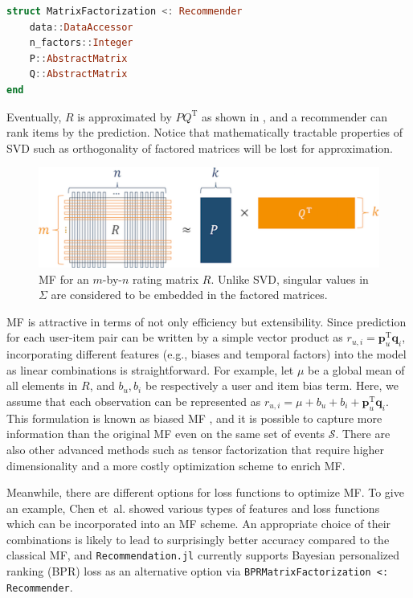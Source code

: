 \begin{lstlisting}[language = Julia]
struct MatrixFactorization <: Recommender
    data::DataAccessor
    n_factors::Integer
    P::AbstractMatrix
    Q::AbstractMatrix
end
\end{lstlisting}

Eventually, $R$ is approximated by $PQ^{\mathrm{T}}$ as shown in , and a recommender can rank items by the prediction. Notice that mathematically tractable properties of SVD such as orthogonality of factored matrices will be lost for approximation.

\begin{figure}[htbp]
  \centering
  \includegraphics[width=0.8\linewidth]{images/mf.pdf}
  \caption{MF for an $m$-by-$n$ rating matrix $R$. Unlike SVD, singular values in $\Sigma$ are considered to be embedded in the factored matrices.}
  \label{fig:mf}
\end{figure}

MF is attractive in terms of not only efficiency but extensibility. Since prediction for each user-item pair can be written by a simple vector product as $r_{u,i} = \mathbf{p}_u^{\mathrm{T}} \mathbf{q}_i$, incorporating different features (e.g., biases and temporal factors) into the model as linear combinations is straightforward. For example, let $\mu$ be a global mean of all elements in $R$, and $b_u, b_i$ be respectively a user and item bias term. Here, we assume that each observation can be represented as $r_{u,i} = \mu + b_u + b_i + \mathbf{p}_u^{\mathrm{T}} \mathbf{q}_i$. This formulation is known as biased MF \cite{Koren2009}, and it is possible to capture more information than the original MF even on the same set of events $\mathcal{S}$. There are also other advanced methods such as tensor factorization \cite{Karatzoglou2010} that require higher dimensionality and a more costly optimization scheme to enrich MF.

Meanwhile, there are different options for loss functions to optimize MF. To give an example, Chen et~al. \cite{Chen2011} showed various types of features and loss functions which can be incorporated into an MF scheme. An appropriate choice of their combinations is likely to lead to surprisingly better accuracy compared to the classical MF, and \texttt{Recommendation.jl} currently supports Bayesian personalized ranking (BPR) loss \cite{10.5555/1795114.1795167} as an alternative option via \texttt{BPRMatrixFactorization <: Recommender}.

